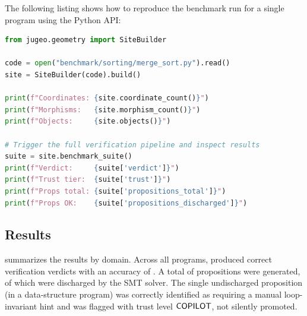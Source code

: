 The following listing shows how to reproduce the benchmark run for a
single program using the \JuGeo{} Python API:

\begin{lstlisting}[language=Python, caption={Running the full \JuGeo{} verification pipeline on a benchmark program.}]
from jugeo.geometry import SiteBuilder

code = open("benchmark/sorting/merge_sort.py").read()
site = SiteBuilder(code).build()

print(f"Coordinates: {site.coordinate_count()}")
print(f"Morphisms:   {site.morphism_count()}")
print(f"Objects:     {site.objects()}")

# Trigger the full verification pipeline and inspect results
suite = site.benchmark_suite()
print(f"Verdict:     {suite['verdict']}")
print(f"Trust tier:  {suite['trust']}")
print(f"Props total: {suite['propositions_total']}")
print(f"Props OK:    {suite['propositions_discharged']}")
\end{lstlisting}

\subsection{Results}\label{sec:results}

 summarizes the results by domain.
Across all \expTotalPrograms{} programs, \JuGeo{} produced correct
verification verdicts with an accuracy of \expAccuracy{}.  A total
of \expPropsSum{} propositions were generated, of which
\expPropsOkSum{} were discharged by the SMT solver.  The single
undischarged proposition (in a data-structure program) was
correctly identified as requiring a manual loop-invariant hint and
was flagged with trust level $\mathsf{COPILOT}$, not silently promoted.

